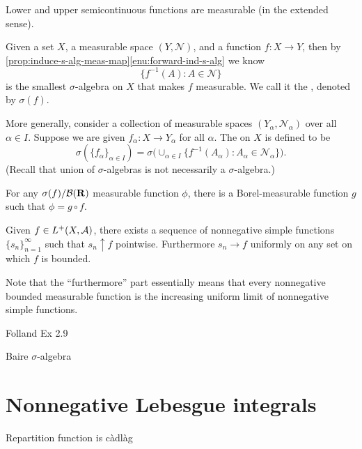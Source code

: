 \begin{xca}
    Lower and upper semicontinuous functions are measurable (in the extended sense).
\end{xca}

Given a set $X$, a measurable space $(Y,\mathcal{N})$, and a function $f\colon X \to Y$, then by \cref{prop:induce-s-alg-meas-map}\ref{enu:forward-ind-s-alg} we know \[
    \{f^{-1}(A):A\in \mathcal{N}\}
\] is the smallest $\sigma$-algebra on $X$ that makes $f$ measurable. We call it the , denoted by $\sigma(f)$.

More generally, consider a collection of measurable spaces $(Y_\alpha,\mathcal{N}_\alpha)$ over all $\alpha \in I$. Suppose we are given $f_\alpha\colon X \to Y_\alpha$ for all $\alpha$. The  on $X$ is defined to be 
\[
    \sigma(\{f_\alpha\}_{\alpha\in I}) = \sigma\bigl(\cup_{\alpha \in I} \{f^{-1}(A_\alpha):A_\alpha\in \mathcal{N}_\alpha\}\bigr).
\] (Recall that union of $\sigma$-algebras is not necessarily a $\sigma$-algebra.)

\begin{prop}
    For any $\sigma(f)/\mathcal{B}(\mathbf{R})$ measurable function $\phi$, there is a Borel-measurable function $g$ such that $\phi = g \circ f$.
\end{prop}

\begin{namedthm}
    Given $f \in L^+(X,\mathcal{A})$, there exists a sequence of nonnegative simple functions $\{s_n\}_{n=1}^\infty$ such that $s_n \uparrow f$ pointwise. Furthermore $s_n \to f$ uniformly on any set on which $f$ is bounded.
\end{namedthm}

Note that the ``furthermore'' part essentially means that every nonnegative bounded measurable function is the increasing uniform limit of nonnegative simple functions.

Folland Ex 2.9

Baire $\sigma$-algebra

\section{Nonnegative Lebesgue integrals}

Repartition function is càdlàg


